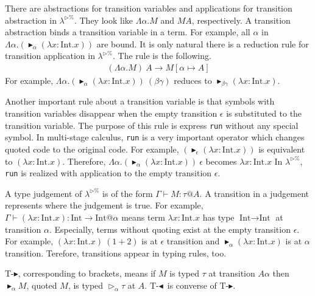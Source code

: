 \documentclass[runningheads]{llncs}
\newcommand{\LTP}{$\lambda^{\triangleright\%}$\xspace}
\newcommand{\G}{\Gamma}
\newcommand{\TW}{\triangleright}
\newcommand{\TB}{\blacktriangleright}
\newcommand{\TBL}{\blacktriangleleft}
\newcommand{\TTB}{\textsc{T-$\TB$}}
\newcommand{\TTBL}{\textsc{T-$\TBL$}}
\newcommand{\I}{\textrm{Int}}
\begin{document}

There are abstractions for transition variables and applications for transition abstraction in \LTP.
They look like $\Lambda\alpha.M$ and $M A$, respectively.
A transition abstraction binds a transition variable in a term.
For example, all $\alpha$ in $\Lambda\alpha.(\TB_\alpha (\lambda x:\I.x))$ are bound.
It is only natural there is a reduction rule for transition application in \LTP.
The rule is the following.
\begin{align*}
    (\Lambda\alpha.M)\ A \longrightarrow M[\alpha\mapsto A]
\end{align*}
For example, $\Lambda\alpha.(\TB_\alpha (\lambda x:\I.x))\ (\beta\gamma)$ reduces to $\TB_{\beta\gamma} (\lambda x:\I.x)$.


Another important rule about a transition variable is 
that symbols with transition variables disappear 
when the empty transition $\epsilon$ is substituted to the transition variable.
The purpose of this rule is express \verb|run| without any special symbol.
In multi-stage calculus, \verb|run| is a very important operator which changes quoted code to the original code.
For example, $(\TB_\epsilon (\lambda x:\I.x))$ is equivalent to $(\lambda x:\I.x)$.
Therefore, $\Lambda\alpha.(\TB_\alpha (\lambda x:\I.x))\ \epsilon$ becomes $\lambda x:\I.x$
In \LTP, \verb|run| is realized with application to the empty transition $\epsilon$.


A type judgement of \LTP is of the form $\G \vdash M : \tau @ A$.
A transition in a judgement represents where the judgement is true.
For example, $\G \vdash (\lambda x:\I.x) : \I \to \I @ \alpha$ means 
term $\lambda x:\I.x$ has type $\I \to \I$ at transition $\alpha$.
Especially, terms without quoting exist at the empty transition $\epsilon$.
For example, $(\lambda x:\I.x)\ (1+2)$ is at $\epsilon$ transition and 
$\TB_\alpha (\lambda x:\I.x)$ is at $\alpha$ transition.
Terefore, transitions appear in typing rules, too.
\begin{center}
    \infrule{\G\vdash M:\tau @{A\alpha}}{\G\vdash \TB_{\alpha}M:\TW_{\alpha}\tau @A}{\TTB} \andalso
    \infrule{\G\vdash M:\TW_{\alpha}\tau @A}{\G\vdash \TBL_{\alpha}M:\tau @{A\alpha}}{\TTBL}
\end{center}
\TTB, corresponding to brackets, means 
if $M$ is typed $\tau$ at transition $A\alpha$ then $\TB_{\alpha}M$, quoted $M$, is typed $\TW_{\alpha}\tau$ at $A$.
\TTBL\ is converse of \TTB.
\end{document}
